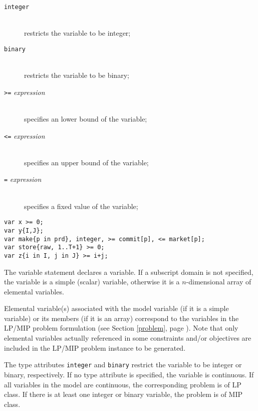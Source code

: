 \documentclass[11pt]{report}
\def\para#1{\noindent{\bf#1}}
\begin{document}
\vspace*{-8pt}

\begin{description}
\item[{\tt integer}]\hspace*{0pt}\\
restricts the variable to be integer;
\item[{\tt binary}]\hspace*{0pt}\\
restricts the variable to be binary;
\item[{\tt>=} {\it expression}]\hspace*{0pt}\\
specifies an lower bound of the variable;
\item[{\tt<=} {\it expression}]\hspace*{0pt}\\
specifies an upper bound of the variable;
\item[{\tt=} {\it expression}]\hspace*{0pt}\\
specifies a fixed value of the variable;
\end{description}

\vspace*{-8pt}

\para{Examples}

\begin{verbatim}
var x >= 0;
var y{I,J};
var make{p in prd}, integer, >= commit[p], <= market[p];
var store{raw, 1..T+1} >= 0;
var z{i in I, j in J} >= i+j;
\end{verbatim}

The variable statement declares a variable. If a subscript domain is
not specified, the variable is a simple (scalar) variable, otherwise it
is a $n$-dimensional array of elemental variables.

Elemental variable(s) associated with the model variable (if it is a
simple variable) or its members (if it is an array) correspond to the
variables in the LP/MIP problem formulation (see Section \ref{problem},
page \pageref{problem}). Note that only elemental variables actually
referenced in some constraints and/or objectives are included in the
LP/MIP problem instance to be generated.

The type attributes {\tt integer} and {\tt binary} restrict the
variable to be integer or binary, respectively. If no type attribute is
specified, the variable is continuous. If all variables in the model
are continuous, the corresponding problem is of LP class. If there is
at least one integer or binary variable, the problem is of MIP class.
\end{document}
